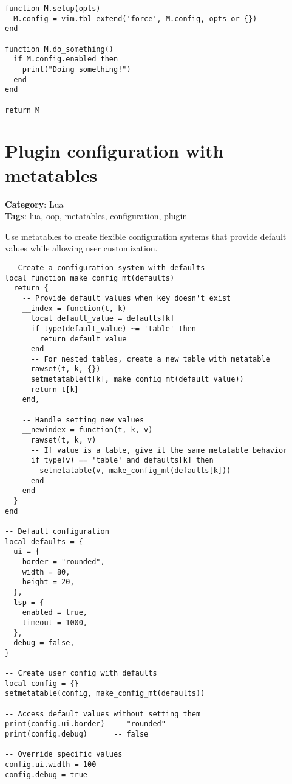 {{{{{{\begin{Exa*}{}
\begin{Verbatim}[fontsize=\footnotesize, breaklines, breakanywhere]
function M.setup(opts)
  M.config = vim.tbl_extend('force', M.config, opts or {})
end

function M.do_something()
  if M.config.enabled then
    print("Doing something!")
  end
end

return M
\end{Verbatim}
\end{Exa*}

\section{Plugin configuration with metatables}

\textbf{Category}: Lua\\ \textbf{Tags}: lua, oop, metatables, configuration, plugin
\vspace{0.5cm}

Use metatables to create flexible configuration systems that provide default values while allowing user customization.

\begin{Exa*}{}
\begin{Verbatim}[fontsize=\footnotesize, breaklines, breakanywhere]
-- Create a configuration system with defaults
local function make_config_mt(defaults)
  return {
    -- Provide default values when key doesn't exist
    __index = function(t, k)
      local default_value = defaults[k]
      if type(default_value) ~= 'table' then
        return default_value
      end
      -- For nested tables, create a new table with metatable
      rawset(t, k, {})
      setmetatable(t[k], make_config_mt(default_value))
      return t[k]
    end,

    -- Handle setting new values
    __newindex = function(t, k, v)
      rawset(t, k, v)
      -- If value is a table, give it the same metatable behavior
      if type(v) == 'table' and defaults[k] then
        setmetatable(v, make_config_mt(defaults[k]))
      end
    end
  }
end

-- Default configuration
local defaults = {
  ui = {
    border = "rounded",
    width = 80,
    height = 20,
  },
  lsp = {
    enabled = true,
    timeout = 1000,
  },
  debug = false,
}

-- Create user config with defaults
local config = {}
setmetatable(config, make_config_mt(defaults))

-- Access default values without setting them
print(config.ui.border)  -- "rounded"
print(config.debug)      -- false

-- Override specific values
config.ui.width = 100
config.debug = true


\end{Verbatim}
\end{Exa*}}}}}}}
